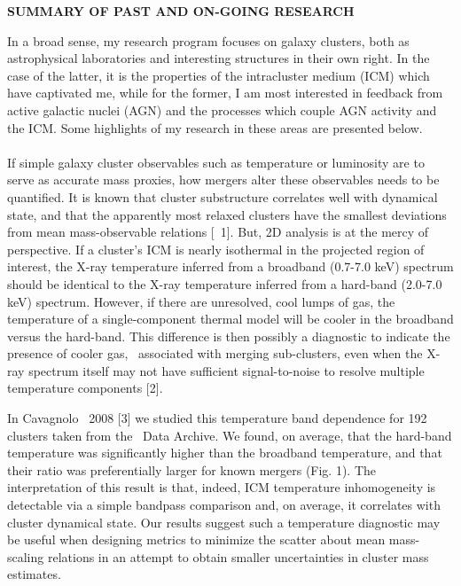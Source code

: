 \documentclass[letterpaper,12pt]{article}
\begin{document}
\begin{center}
  {\bf\uppercase{Summary of Past and On-going Research}}
\end{center}

In a broad sense, my research program focuses on galaxy clusters, both
as astrophysical laboratories and interesting structures in their own
right. In the case of the latter, it is the properties of the
intracluster medium (ICM) which have captivated me, while for the
former, I am most interested in feedback from active galactic nuclei
(AGN) and the processes which couple AGN activity and the ICM. Some
highlights of my research in these areas are presented below.\\

\\
\indent If simple galaxy cluster observables such as temperature or
luminosity are to serve as accurate mass proxies, how mergers alter
these observables needs to be quantified. It is known that cluster
substructure correlates well with dynamical state, and that the
apparently most relaxed clusters have the smallest deviations from
mean mass-observable relations [\eg\ 1]. But, 2D analysis is at the
mercy of perspective. If a cluster's ICM is nearly isothermal in the
projected region of interest, the X-ray temperature inferred from a
broadband (0.7-7.0 keV) spectrum should be identical to the X-ray
temperature inferred from a hard-band (2.0-7.0 keV) spectrum. However,
if there are unresolved, cool lumps of gas, the temperature of a
single-component thermal model will be cooler in the broadband versus
the hard-band. This difference is then possibly a diagnostic to
indicate the presence of cooler gas, \eg\ associated with merging
sub-clusters, even when the X-ray spectrum itself may not have
sufficient signal-to-noise to resolve multiple temperature components
[2].

In Cavagnolo \etal\ 2008 [3] we studied this temperature band
dependence for 192 clusters taken from the \chandra\ Data Archive. We
found, on average, that the hard-band temperature was significantly
higher than the broadband temperature, and that their ratio was
preferentially larger for known mergers (Fig. 1). The interpretation
of this result is that, indeed, ICM temperature inhomogeneity is
detectable via a simple bandpass comparison and, on average, it
correlates with cluster dynamical state. Our results suggest such a
temperature diagnostic may be useful when designing metrics to
minimize the scatter about mean mass-scaling relations in an attempt
to obtain smaller uncertainties in cluster mass estimates.\\
\end{document}
